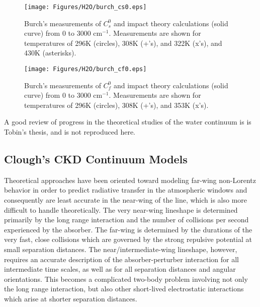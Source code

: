 \documentclass[11pt]{article}
\begin{document}
\begin{figure}[h]
\begin{center}
\texttt{[image: Figures/H2O/burch\_cs0.eps]}\end{center}
\caption[Burch's measurements of $C_s^0$, the self-broadened continuum
coefficients, and impact theory calculations
from 0 to 3000 cm$^{-1}$.]{Burch's measurements of $C_s^0$ and impact
theory calculations (solid curve) from 0 to 3000 cm$^{-1}$.
Measurements are shown for temperatures of 296K (circles), 308K (+'s), and 
322K (x's), and 430K (asterisks).}
\label{fig:burch_data1}
\end{figure}

\begin{figure}[h]
\begin{center}
\texttt{[image: Figures/H2O/burch\_cf0.eps]}
\end{center}
\caption[Burch's measurements of $C_f^0$, the nitrogen broadened continuum
coefficients, and impact theory calculations from 0 to 3000 cm$^{-1}$.] 
{Burch's measurements of $C_f^0$ and impact theory calculations 
(solid curve) from 0 to 3000 cm$^{-1}$.  Measurements are shown for 
temperatures of 296K (circles), 308K (+'s), and 353K (x's).}
\label{fig:burch_data2}
\end{figure}

A good review of progress in the theoretical studies of the water
continuum is is Tobin's thesis, and is not reproduced here. 

\subsection{Clough's CKD Continuum Models}\label{sec:ckd}

Theoretical approaches have been oriented toward modeling 
far-wing non-Lorentz behavior in order to predict radiative transfer in the
atmospheric windows and consequently are least accurate in the
near-wing of the line, which is also more difficult to handle theoretically.
The very near-wing lineshape is determined primarily by the long
range interaction and the number of collisions per second experienced by
the absorber.  The far-wing is determined by the durations of the very
fast, close collisions which are governed by the strong repulsive
potential at small separation distances.  The
near/intermediate-wing lineshape, however, requires an accurate description
of the absorber-perturber interaction for all intermediate time scales, as
well as for all separation distances and angular orientations.  This
becomes a complicated two-body problem involving not only the long range
interaction, but also other short-lived electrostatic interactions which 
arise at shorter separation distances.
\end{document}
